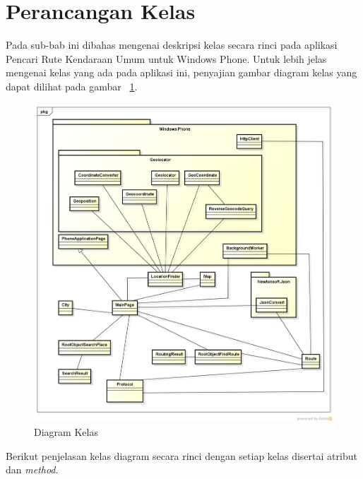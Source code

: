 \newpage

\section{Perancangan Kelas}
\label{lab:Perancangan Kelas}
\hspace{0.5cm} Pada sub-bab ini dibahas mengenai deskripsi kelas secara rinci pada aplikasi Pencari Rute Kendaraan Umum untuk Windows Phone. Untuk lebih jelas mengenai kelas yang ada pada aplikasi ini, penyajian gambar diagram kelas yang dapat dilihat pada  gambar ~\ref{fig:kelas}. 

\begin{figure}[h!]
	\centering
		\includegraphics[scale=0.5]{Gambar/useCase_dan_Class/class4kosong}
	\caption{Diagram Kelas}
	\label{fig:kelas}
\end{figure}

Berikut penjelasan kelas diagram secara rinci dengan setiap kelas disertai atribut dan \textit{method}.

